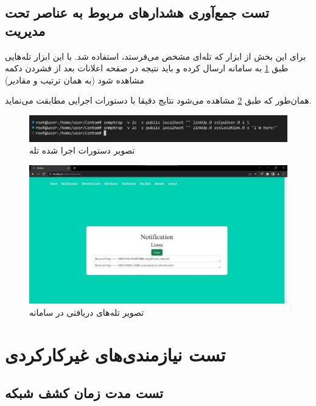 \cleardoublepage


\subsection{تست جمع‌آوری هشدارهای مربوط به عناصر تحت مدیریت}

برای این بخش از ابزار  که تله‌ای مشخص می‌فرستد، استفاده شد. با این ابزار تله‌هایی طبق \cref{fig.55} به سامانه ارسال کرده و باید نتیجه در صفحه اعلانات بعد از فشردن دکمه مشاهده شود (به همان ترتیب و مقادیر)


همان‌طور که طبق \cref{fig.56} مشاهده می‌شود نتایج دقیقا با دستورات اجرایی مطابقت می‌نماید.


\begin{figure}[!h]
    \centering\includegraphics[scale=.70]{./trap-before}
    \caption{تصویر دستورات اجرا شده تله}\label{fig.55}
\end{figure}

\begin{figure}[!h]
    \centering\includegraphics[scale=.38]{./notification}
    \caption{تصویر تله‌های دریافتی در سامانه}\label{fig.56}
\end{figure}

\cleardoublepage

\section{تست نیازمندی‌های غیرکارکردی}


\subsection{تست مدت زمان کشف شبکه}


